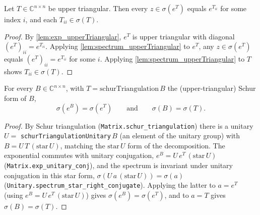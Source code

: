 \begin{lemma}
    \label{lem:spectrum_exp_triangular}
    \leanok
    Let $T \in \mathbb{C}^{n \times n}$ be upper triangular. Then every $z \in
    \sigma(e^{T})$ equals $e^{T_{ii}}$ for some index $i$, and each $T_{ii} \in
    \sigma(T)$.
\end{lemma}
\begin{proof}
    By \cref{lem:exp_upperTriangular}, $e^{T}$ is upper triangular with diagonal
    $(e^{T})_{ii} = e^{T_{ii}}$. Applying \cref{lem:spectrum_upperTriangular} to
    $e^{T}$, any $z \in \sigma(e^{T})$ equals $(e^{T})_{ii} = e^{T_{ii}}$ for
    some $i$. Applying \cref{lem:spectrum_upperTriangular} to $T$ shows
    $T_{ii} \in \sigma(T)$.
\end{proof}

\begin{lemma}
    \label{lem:spectrum_exp_eq_schur}
    \leanok
    For every $B \in \mathbb{C}^{n \times n}$, with $T = \mathrm{schurTriangulation}\,B$
    the (upper-triangular) Schur form of $B$,
    \[ \sigma(e^{B}) = \sigma(e^{T}) \qquad\text{and}\qquad \sigma(B) = \sigma(T). \]
\end{lemma}
\begin{proof}
    By Schur triangulation (\texttt{Matrix.schur\_triangulation}) there is a
    unitary $U = $ \texttt{schurTriangulationUnitary}\,$B$ (an element of the
    unitary group) with $B = U\,T\,(\mathrm{star}\,U)$, matching the
    $\mathrm{star}\,U$ form of the decomposition. The exponential commutes with
    unitary conjugation, $e^{B} = U\,e^{T}\,(\mathrm{star}\,U)$
    (\texttt{Matrix.exp\_unitary\_conj}), and the spectrum is invariant under
    unitary conjugation in this star form,
    $\sigma(U\,a\,(\mathrm{star}\,U)) = \sigma(a)$
    (\texttt{Unitary.spectrum\_star\_right\_conjugate}). Applying the latter to
    $a = e^{T}$ (using $e^{B} = U\,e^{T}\,(\mathrm{star}\,U)$) gives
    $\sigma(e^{B}) = \sigma(e^{T})$, and to $a = T$ gives $\sigma(B) = \sigma(T)$.
\end{proof}

